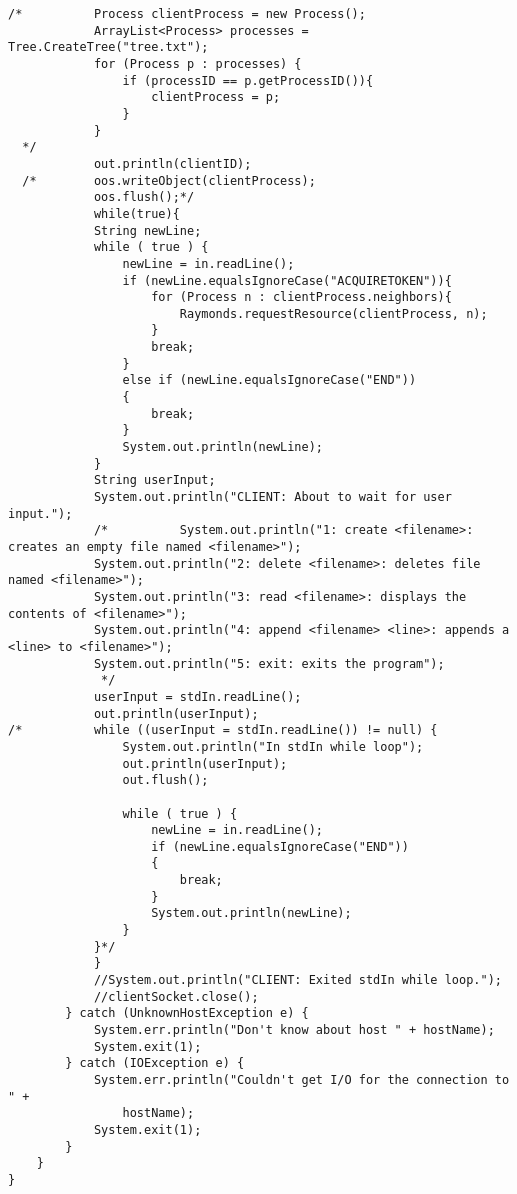 \documentclass{article}
\begin{document}
\begin{lstlisting}
/*        	Process clientProcess = new Process();
        	ArrayList<Process> processes = Tree.CreateTree("tree.txt");
			for (Process p : processes) {
				if (processID == p.getProcessID()){
					clientProcess = p;
				}
			}
  */      	
        	out.println(clientID);
  /*      	oos.writeObject(clientProcess);
        	oos.flush();*/
        	while(true){
        	String newLine;
        	while ( true ) {
        		newLine = in.readLine();
        		if (newLine.equalsIgnoreCase("ACQUIRETOKEN")){
        			for (Process n : clientProcess.neighbors){
        				Raymonds.requestResource(clientProcess, n);
        			}
        			break;
        		}
        		else if (newLine.equalsIgnoreCase("END"))
        		{
        			break;
        		}
        		System.out.println(newLine);
        	}
        	String userInput;
        	System.out.println("CLIENT: About to wait for user input.");
        	/*    		System.out.println("1: create <filename>: creates an empty file named <filename>");
    		System.out.println("2: delete <filename>: deletes file named <filename>");
    		System.out.println("3: read <filename>: displays the contents of <filename>");
    		System.out.println("4: append <filename> <line>: appends a <line> to <filename>");
    		System.out.println("5: exit: exits the program");
        	 */ 
        	userInput = stdIn.readLine();
        	out.println(userInput);
/*        	while ((userInput = stdIn.readLine()) != null) {
        		System.out.println("In stdIn while loop");
        		out.println(userInput);
        		out.flush();

        		while ( true ) {
            		newLine = in.readLine();              
            		if (newLine.equalsIgnoreCase("END"))
            		{
            		    break;
            		}
            		System.out.println(newLine);
            	}
        	}*/
        	}
            //System.out.println("CLIENT: Exited stdIn while loop.");
            //clientSocket.close();
        } catch (UnknownHostException e) {
            System.err.println("Don't know about host " + hostName);
            System.exit(1);
        } catch (IOException e) {
            System.err.println("Couldn't get I/O for the connection to " +
                hostName);
            System.exit(1);
        } 
    }
}
		\end{lstlisting}
\end{document}
